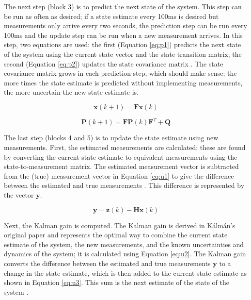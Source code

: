 \documentclass[11pt]{ucthesisCP}
\begin{document}
The next step (block 3) is to predict the next state of the system. This step can be run as often as desired; if a state estimate every 100ms is desired but measurements only arrive every two seconds, the prediction step can be run every 100ms and the update step can be run when a new measurement arrives. In this step, two equations are used: the first (Equation \ref{eq:p1}) predicts the next state of the system using the current state vector and the state transition matrix; the second (Equation \ref{eq:p2}) updates the state covariance matrix \cite{kfsimply}. The state covariance matrix grows in each prediction step, which should make sense; the more times the state estimate is predicted without implementing measurements, the more uncertain the new state estimate is.

\begin{equation} \label{eq:p1}
	\mathbf{x}(k+1) = \mathbf{F} \mathbf{x}(k)
\end{equation}

\begin{equation} \label{eq:p2}
	\mathbf{P}(k+1) = \mathbf{F} \mathbf{P}(k) \mathbf{F}^T + \mathbf{Q}
\end{equation}

The last step (blocks 4 and 5) is to update the state estimate using new measurements. First, the estimated measurements are calculated; these are found by converting the current state estimate to equivalent measurements using the state-to-measurement matrix. The estimated measurement vector is subtracted from the (true) measurement vector in Equation \ref{eq:u1} to give the difference between the estimated and true measurements \cite{kfsimply}. This difference is represented by the vector \(\mathbf{y}\).

\begin{equation} \label{eq:u1}
	\mathbf{y} = \mathbf{z}(k) - \mathbf{H} \mathbf{x}(k)
\end{equation}

Next, the Kalman gain is computed. The Kalman gain is derived in Kálmán’s original paper \cite{kalman} and represents the optimal way to combine the current state estimate of the system, the new measurements, and the known uncertainties and dynamics of the system; it is calculated using Equation \ref{eq:u2}. The Kalman gain converts the difference between the estimated and true measurements \(\mathbf{y}\) to a change in the state estimate, which is then added to the current state estimate as shown in Equation \ref{eq:u3}. This sum is the next estimate of the state of the system \cite{kfsimply}.
\end{document}
